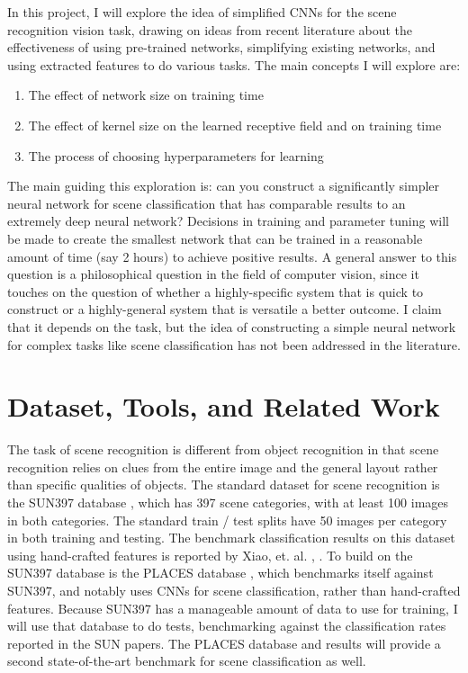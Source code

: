 \documentclass[10pt]{article}
\begin{document}
In this project, I will explore the idea of simplified CNNs for the scene recognition vision task, drawing on ideas from recent literature about the effectiveness of using pre-trained networks, simplifying existing networks, and using extracted features to do various tasks. The main concepts I will explore are: 

\begin{enumerate}
	\item The effect of network size on training time 
	\item The effect of kernel size on the learned receptive field and on training time
	\item The process of choosing hyperparameters for learning
\end{enumerate}

The main guiding this exploration is: can you construct a significantly simpler neural network for scene classification that has comparable results to an extremely deep neural network? Decisions in training and parameter tuning will be made to create the smallest network that can be trained in a reasonable amount of time (say 2 hours) to achieve positive results. A general answer to this question is a philosophical question in the field of computer vision, since it touches on the question of whether a highly-specific system that is quick to construct or a highly-general system that is versatile a better outcome. I claim that it depends on the task, but the idea of constructing a simple neural network for complex tasks like scene classification has not been addressed in the literature.

\section{Dataset, Tools, and Related Work}

The task of scene recognition is different from object recognition in that scene recognition relies on clues from the entire image and the general layout rather than specific qualities of objects. The standard dataset for scene recognition is the SUN397 database \cite{xiao_sun_2010}, which has 397 scene categories, with at least 100 images in both categories. The standard train / test splits have 50 images per category in both training and testing. The benchmark classification results on this dataset using hand-crafted features is reported by Xiao, et. al. \cite{xiao_sun_2010}, \cite{xiao_sun_2014}. To build on the SUN397 database is the PLACES database \cite{zhou_learning_2014}, which benchmarks itself against SUN397, and notably uses CNNs for scene classification, rather than hand-crafted features. Because SUN397 has a manageable amount of data to use for training, I will use that database to do tests, benchmarking against the classification rates reported in the SUN papers. The PLACES database and results will provide a second state-of-the-art benchmark for scene classification as well.
\end{document}
